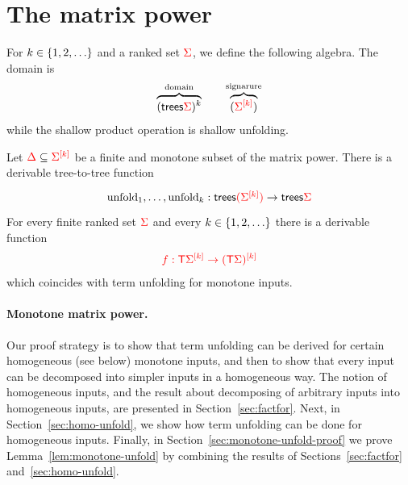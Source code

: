 \section{The matrix power}

\newcommand{\treeunfold}{\mathrm{unfold}}



\begin{definition}
    For $k \in \set{1,2,\ldots}$ and a ranked set $\rSigma$, we define the following algebra. The domain is 
    \begin{align*}
    \overbrace{(\trees \rSigma)^k}^{\text{domain}} \qquad \overbrace{(\mati k \rSigma)}^{\text{signarure}}
    \end{align*}
    while the shallow product operation is shallow unfolding.
\end{definition}

\begin{lemma}\label{lem:monotone-unfold}
    Let $\rDelta \subseteq \mati k \rSigma$ be a finite and monotone subset of the matrix power.  There is a derivable tree-to-tree function
\begin{align*}
\xymatrix{
    \treeunfold_1,\ldots,\treeunfold_k : \treepar {\mati k \rSigma} \to \trees \rSigma
}
\end{align*}
    For every finite ranked set $\rSigma$ and every $k \in \set{1,2,\ldots}$ there is a derivable function 
    \begin{align*}
    \ranked{ f : \tmonad \mati k \Sigma \to \mati k {(\tmonad \Sigma)}}
    \end{align*}
    which coincides with term unfolding for monotone inputs.
\end{lemma}



\paragraph{Monotone matrix power.}

Our proof strategy is to show that term unfolding can be derived for certain homogeneous (see below) monotone inputs, and then to show that every input can be decomposed into simpler inputs in a homogeneous way. The notion of homogeneous inputs, and the result about  decomposing of arbitrary inputs into homogeneous inputs, are presented in Section~\ref{sec:factfor}. Next, in Section~\ref{sec:homo-unfold}, we show how term unfolding can be done for homogeneous inputs. Finally, in Section~\ref{sec:monotone-unfold-proof} we prove Lemma~\ref{lem:monotone-unfold} by combining  the results of Sections~\ref{sec:factfor} and~\ref{sec:homo-unfold}.

